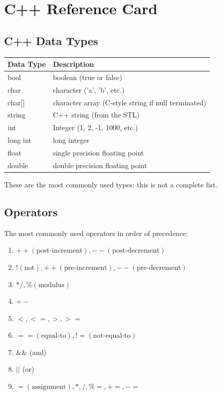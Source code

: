 \documentclass{article}
\begin{document}
\section*{C++ Reference Card}

\subsection*{C++ Data Types}
\begin{tabular}{|l|l|}
\hline
\textbf{Data Type} & \textbf{Description} \\
\hline
bool & boolean (true or false) \\
\hline
char & character ('a', 'b', etc.) \\
\hline
char[] & character array (C-style string if null terminated) \\
\hline
string & C++ string (from the STL) \\
\hline
int & Integer (1, 2, -1, 1000, etc.) \\
\hline
long int & long integer \\
\hline
float & single precision floating point \\
\hline
double & double precision floating point \\
\hline
\end{tabular}

These are the most commonly used types: this is not a complete list.

\subsection*{Operators}
The most commonly used operators in order of precedence:
\begin{enumerate}
    \item $++(\text{post-increment}), --(\text{post-decrement})$
    \item $!(\text{not}), ++ (\text{pre-increment}), -- (\text{pre-decrement})$
    \item $* / , \% (\text{modulus})$
    \item $+-$
    \item $<, <=, >, >=\text{}$
    \item $==(\text{equal-to}), != (\text{not-equal-to})$
    \item $\&\&$ (and)
    \item $||$ (or)
    \item $= (\text{assignment}), * , / , \%= , +=, -= $
\end{enumerate}
\end{document}
